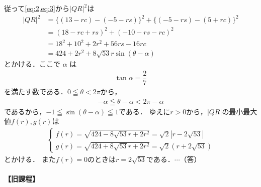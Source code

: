 \documentclass[../../main.tex]{subfiles}
\begin{document}
従って\cref{eq:2,eq:3}から$|QR|^2$は
\begin{align}
  |QR|^2
  &= \{(13-rc) - (-5-rs)\}^2 + \{(-5-rs) - (5+rc)\}^2 \\
  &= (18-rc+rs)^2 + (-10-rs-rc)^2 \\
  &= 18^2 + 10^2 + 2r^2 + 56rs - 16rc \\
  &= 424 + 2r^2 + 8\sqrt{53}r\sin(\theta-\alpha) \label{eq:4}
\end{align}
とかける．ここで $\alpha$ は
\begin{align}
  \tan\alpha = \dfrac{2}{7} \label{eq:5}
\end{align}
を満たす数である．$0 \leqq \theta < 2\pi$から，
\begin{align}
  -\alpha \leqq \theta - \alpha < 2\pi - \alpha
\end{align}
であるから，$-1 \leqq \sin(\theta-\alpha) \leqq 1$である．
ゆえに$r>0$から，$|QR|$の最小最大値$f(r),g(r)$は
\begin{align}
  \begin{cases}
    f(r) = \sqrt{424-8\sqrt{53}r+2r^2} = \sqrt{2}|r-2\sqrt{53}| \\
    g(r) = \sqrt{424+8\sqrt{53}r+2r^2} = \sqrt{2}(r+2\sqrt{53})
  \end{cases}
\end{align}
とかける．
また$f(r)=0$のときは$r=2\sqrt{53}$である．$\cdots\text{（答）}$

\paragraph{【旧課程】}
\end{document}

